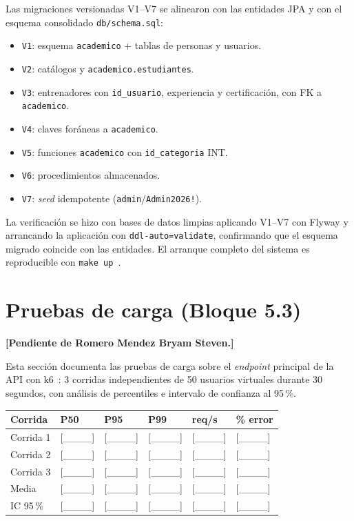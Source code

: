 \documentclass[11pt,a4paper]{article}
\newcommand{\ruta}[1]{\texttt{\footnotesize #1}}
\newcommand{\porintegrante}[1]{\textcolor{alerta}{\textbf{[Pendiente de #1]}}}
\begin{document}
Las migraciones versionadas V1--V7 se alinearon con las entidades JPA y con
el esquema consolidado \ruta{db/schema.sql}:

\begin{itemize}[leftmargin=*]
  \item \texttt{V1}: esquema \texttt{academico} + tablas de personas y
    usuarios.
  \item \texttt{V2}: catálogos y \texttt{academico.estudiantes}.
  \item \texttt{V3}: entrenadores con \texttt{id\_usuario}, experiencia y
    certificación, con FK a \texttt{academico}.
  \item \texttt{V4}: claves foráneas a \texttt{academico}.
  \item \texttt{V5}: funciones \texttt{academico} con \texttt{id\_categoria}
    INT.
  \item \texttt{V6}: procedimientos almacenados.
  \item \texttt{V7}: \emph{seed} idempotente (\texttt{admin}/\texttt{Admin2026!}).
\end{itemize}

La verificación se hizo con bases de datos limpias aplicando V1--V7 con
Flyway y arrancando la aplicación con \texttt{ddl-auto=validate}, confirmando
que el esquema migrado coincide con las entidades. El arranque completo del
sistema es reproducible con \texttt{make up}~\cite{flyway}.

\section{Pruebas de carga (Bloque 5.3)}
\label{sec:carga}
\porintegrante{Romero Mendez Bryam Steven.}

Esta sección documenta las pruebas de carga sobre el \emph{endpoint}
principal de la API con k6~\cite{k6docs}: 3 corridas independientes de 50
usuarios virtuales durante 30 segundos, con análisis de percentiles e
intervalo de confianza al 95\,\%.

\begin{center}
\begin{tabular}{@{}llllll@{}}
\toprule
\textbf{Corrida} & \textbf{P50} & \textbf{P95} & \textbf{P99} & \textbf{req/s} & \textbf{\% error} \\
\midrule
Corrida 1 & [\_\_\_\_] & [\_\_\_\_] & [\_\_\_\_] & [\_\_\_\_] & [\_\_\_\_] \\
Corrida 2 & [\_\_\_\_] & [\_\_\_\_] & [\_\_\_\_] & [\_\_\_\_] & [\_\_\_\_] \\
Corrida 3 & [\_\_\_\_] & [\_\_\_\_] & [\_\_\_\_] & [\_\_\_\_] & [\_\_\_\_] \\
\midrule
Media & [\_\_\_\_] & [\_\_\_\_] & [\_\_\_\_] & [\_\_\_\_] & [\_\_\_\_] \\
IC 95\,\% & [\_\_\_\_] & [\_\_\_\_] & [\_\_\_\_] & [\_\_\_\_] & [\_\_\_\_] \\
\bottomrule
\end{tabular}
\end{center}
\end{document}
